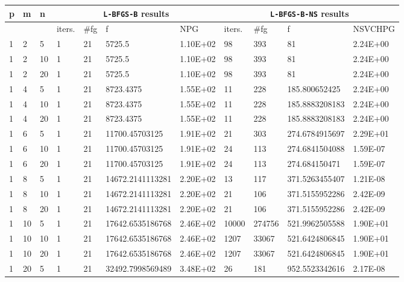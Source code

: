\begin{table}
  \scriptsize
  \begin{center}
    \begin{tabular}{|l|l|l|l|l|l|l|l|l|l|l|}
      \hline
      p  &  m  &  n  & \multicolumn{4}{|c|}{\texttt{L-BFGS-B} results} & \multicolumn{4}{|c|}{\texttt{L-BFGS-B-NS} results} \\ \hline
      & &  & iters. & \#fg & f & NPG & iters. & \#fg & f & NSVCHPG \\ \hline
     1 & 2 & 5  & 1 & 21 & 5725.5 & 1.10E+02 & 98 & 393 & 81 & 2.24E+00 \\
    1 &   2 & 10  & 1 & 21 & 5725.5 & 1.10E+02 & 98 & 393 & 81 & 2.24E+00\\
    1 &   2 & 20 & 1 & 21 & 5725.5 & 1.10E+02 & 98 & 393 & 81 & 2.24E+00 \\
    1 &   4 & 5 & 1 & 21 & 8723.4375 & 1.55E+02 & 11 & 228 & 185.800652425 & 2.24E+00\\
    1 &   4 & 10 & 1 & 21 & 8723.4375 & 1.55E+02 & 11 & 228 & 185.8883208183 & 2.24E+00 \\
     1 &  4 & 20 & 1 & 21 & 8723.4375 & 1.55E+02 & 11 & 228 & 185.8883208183 & 2.24E+00\\
    1 &   6 & 5 & 1 & 21 & 11700.45703125 & 1.91E+02 & 21 & 303 & 274.6784915697 & 2.29E+01\\ 
     1 &  6 & 10  & 1 & 21 & 11700.45703125 & 1.91E+02 & 24 & 113 & 274.6841504088 & 1.59E-07\\
    1 &   6 & 20  & 1 & 21 & 11700.45703125 & 1.91E+02 & 24 & 113 & 274.684150471 & 1.59E-07\\
    1 &   8 & 5 &  1 & 21 & 14672.2141113281 & 2.20E+02 & 13 & 117 & 371.5263455407 & 1.21E-08\\
    1 &   8 & 10  & 1 & 21 & 14672.2141113281 & 2.20E+02 & 21 & 106 & 371.5155952286 & 2.42E-09\\
     1 &  8 & 20  & 1 & 21 & 14672.2141113281 & 2.20E+02 & 21 & 106 & 371.5155952286 & 2.42E-09\\
    1 &   10 & 5  & 1 & 21 & 17642.6535186768 & 2.46E+02 & 10000 & 274756 & 521.9962505588 & 1.90E+01 \\
    1 &   10 & 10  & 1 & 21 & 17642.6535186768 & 2.46E+02 & 1207 & 33067 & 521.6424806845 & 1.90E+01\\
     1 &  10 & 20  & 1 & 21 & 17642.6535186768 & 2.46E+02 & 1207 & 33067 & 521.6424806845 & 1.90E+01\\
    1 &   20 & 5  & 1 & 21 & 32492.7998569489 & 3.48E+02 & 26 & 181 & 952.5523342616 & 2.17E-08\\

\end{tabular}
\end{center}
\end{table}
